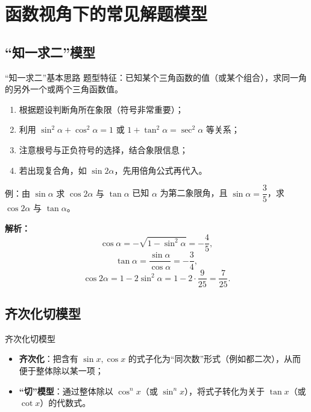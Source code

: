 \documentclass[a4paper,11pt]{ctexart}
\begin{document}
\section{函数视角下的常见解题模型}
\label{sec:models-func}

\subsection{“知一求二”模型}

\begin{summarybox}{“知一求二”基本思路}
题型特征：已知某个三角函数的值（或某个组合），求同一角的另外一个或两个三角函数值。
\begin{enumerate}
  \item 根据题设判断角所在象限（符号非常重要）；
  \item 利用 $\sin^2\alpha+\cos^2\alpha=1$ 或 $1+\tan^2\alpha=\sec^2\alpha$ 等关系；
  \item 注意根号与正负符号的选择，结合象限信息；
  \item 若出现复合角，如 $\sin2\alpha$，先用倍角公式再代入。
\end{enumerate}
\end{summarybox}

\begin{examplebox}{例：由 $\sin\alpha$ 求 $\cos2\alpha$ 与 $\tan\alpha$}
已知 $\alpha$ 为第二象限角，且 $\sin\alpha=\dfrac{3}{5}$，求 $\cos2\alpha$ 与 $\tan\alpha$。
\par\textbf{解析：}
\[
\cos\alpha = -\sqrt{1-\sin^2\alpha} = -\frac{4}{5},
\]
\[
\tan\alpha = \frac{\sin\alpha}{\cos\alpha} = -\frac{3}{4},
\]
\[
\cos2\alpha = 1-2\sin^2\alpha = 1-2\cdot\frac{9}{25}=\frac{7}{25}.
\]
\end{examplebox}

\subsection{齐次化切模型}

\begin{definitionbox}{齐次化切模型}
\begin{itemize}
  \item \textbf{齐次化}：把含有 $\sin x,\cos x$ 的式子化为“同次数”形式（例如都二次），从而便于整体除以某一项；
  \item \textbf{“切”模型}：通过整体除以 $\cos^n x$（或 $\sin^n x$），将式子转化为关于 $\tan x$（或 $\cot x$）的代数式。
\end{itemize}
\end{definitionbox}
\end{document}
